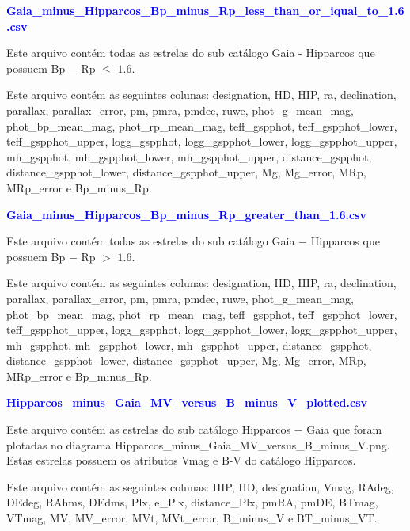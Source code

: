 \documentclass{article}
\begin{document}
	\vspace{10pt}

	\textcolor{blue}{\textbf{Gaia\_minus\_Hipparcos\_Bp\_minus\_Rp\_less\_than\_or\_iqual\_to\_1.6.csv}}
		
	\vspace{10pt}
	
	
	Este arquivo contém todas as estrelas do sub catálogo Gaia - Hipparcos que possuem Bp $-$ Rp $\leq$ $1.6$.
	
	Este arquivo contém as seguintes colunas:
	designation, HD, HIP, ra, declination, parallax, parallax\_error, pm, pmra, pmdec, ruwe, phot\_g\_mean\_mag, phot\_bp\_mean\_mag, phot\_rp\_mean\_mag, teff\_gspphot, teff\_gspphot\_lower, teff\_gspphot\_upper, logg\_gspphot, logg\_gspphot\_lower, logg\_gspphot\_upper, mh\_gspphot, mh\_gspphot\_lower, mh\_gspphot\_upper, distance\_gspphot, distance\_gspphot\_lower, distance\_gspphot\_upper, Mg, Mg\_error, MRp, MRp\_error e Bp\_minus\_Rp.
	
	\newpage

	\textcolor{blue}{\textbf{Gaia\_minus\_Hipparcos\_Bp\_minus\_Rp\_greater\_than\_1.6.csv}}
	
	\vspace{10pt}
	
	Este arquivo contém todas as estrelas do sub catálogo Gaia $-$ Hipparcos que possuem Bp $-$ Rp $>$ $1.6$.
	
	Este arquivo contém as seguintes colunas:
	designation, HD, HIP, ra, declination, parallax, parallax\_error, pm, pmra, pmdec, ruwe, phot\_g\_mean\_mag, phot\_bp\_mean\_mag, phot\_rp\_mean\_mag, teff\_gspphot, teff\_gspphot\_lower, teff\_gspphot\_upper, logg\_gspphot, logg\_gspphot\_lower, logg\_gspphot\_upper, mh\_gspphot, mh\_gspphot\_lower, mh\_gspphot\_upper, distance\_gspphot, distance\_gspphot\_lower, distance\_gspphot\_upper, Mg, Mg\_error, MRp, MRp\_error e Bp\_minus\_Rp.
	
	\vspace{10pt}
	
	\textcolor{blue}{\textbf{Hipparcos\_minus\_Gaia\_MV\_versus\_B\_minus\_V\_plotted.csv}}
		
	\vspace{10pt}
		
	Este arquivo contém as estrelas do sub catálogo Hipparcos $-$ Gaia que foram plotadas no diagrama Hipparcos\_minus\_Gaia\_MV\_versus\_B\_minus\_V.png. 
	Estas estrelas possuem os atributos Vmag e B-V do catálogo Hipparcos.
	
	Este arquivo contém as seguintes colunas:
	HIP, HD, designation, Vmag, RAdeg, DEdeg, RAhms, DEdms, Plx, e\_Plx, distance\_Plx, pmRA, pmDE, BTmag, VTmag, MV, MV\_error, MVt, MVt\_error, B\_minus\_V e BT\_minus\_VT.
	
\end{document}
